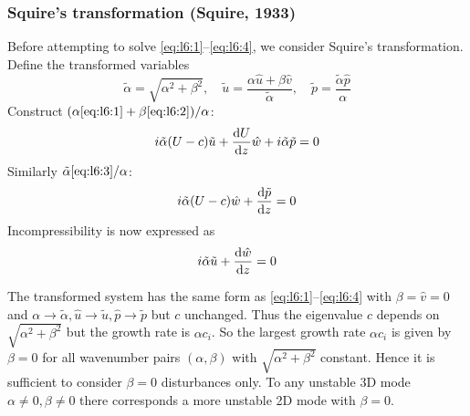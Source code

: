 \documentclass{jknotes}
\begin{document}
\subsubsection{Squire's transformation (Squire, 1933)}
Before  attempting to solve \eqref{eq:l6:1}--\eqref{eq:l6:4}, we consider
Squire's transformation. Define the transformed variables
\begin{equation}
	\tilde{\alpha} = \sqrt{\alpha^2 + \beta^2},\hspace{1em} \tilde{u} =
	\frac{\alpha \hat{u} + \beta \hat{v}}{\tilde{\alpha}}, \hspace{1em}
	\tilde{p} = \frac{\tilde{\alpha}\hat{p}}{\alpha}
\end{equation}
Construct $(\alpha\eqref{eq:l6:1} + \beta\eqref{eq:l6:2})/\alpha$:
\begin{equation}
	i\tilde{\alpha}(U-c)\tilde{u} + \frac{\diffd  U}{\diffd z} \hat{w} +
	i\tilde{\alpha}\tilde{p} =  0\label{eq:l6:5}
\end{equation}
Similarly $\tilde{\alpha}\eqref{eq:l6:3}/\alpha$:
\begin{equation}
	i\tilde{\alpha}(U-c)\hat{w} + \frac{\diffd \tilde{p}}{\diffd z} =
	0\label{eq:l6:6}
\end{equation}
Incompressibility is now expressed as
\begin{equation}
	i\tilde{\alpha}\tilde{u}  + \frac{\diffd \hat{w}}{\diffd z} = 0
\end{equation}

The transformed system has the same form as \eqref{eq:l6:1}--\eqref{eq:l6:4}
with $\beta = \hat{v} = 0$ and $\alpha \to \tilde{\alpha},
\hat{u}\to\tilde{u}, \hat{p}\to\tilde{p}$ but $c$ unchanged. Thus the
eigenvalue $c$ depends on $\sqrt{\alpha^2+\beta^2}$ but the growth rate is
$\alpha c_i$. So the largest growth rate $\alpha c_i$ is given by $\beta = 0$
for all wavenumber pairs $(\alpha,\beta)$ with $\sqrt{\alpha^2 + \beta^2}$
constant. Hence it is sufficient to consider $\beta = 0$ disturbances only. To
any unstable 3D mode $\alpha \ne 0, \beta \ne 0$ there corresponds a more
unstable 2D mode with $\beta = 0$.
\end{document}
